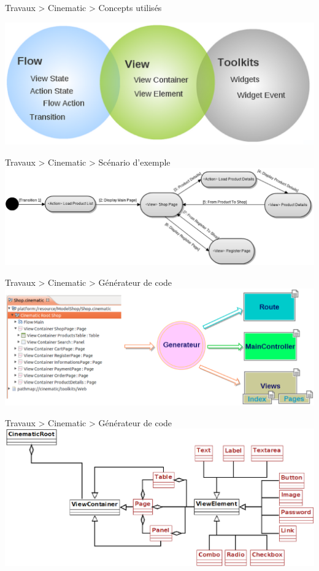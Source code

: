 \documentclass[HeilHazel,pdf,final,colorBG,slideColor]{prosper}
\begin{document}
\begin{slide}{Travaux > Cinematic > Concepts utilisés}

  \bc{} 
    \includegraphics[scale=.3]{img/cinematic_concepts.eps} 
  \ec{}

\end{slide}

\begin{slide}{Travaux > Cinematic > Scénario d'exemple}
  \bc{} 
    \includegraphics[scale=.25]{img/cinematic_act.eps} 
  \ec{}
\end{slide}

\begin{slide}{Travaux > Cinematic > Générateur de code}
    \includegraphics[scale=.3]{img/cinematic_gen.eps} 
\end{slide}

\begin{slide}{Travaux > Cinematic > Générateur de code}
    \includegraphics[scale=.3]{img/cinematic_exp1.eps} 
\end{slide}
\end{document}
